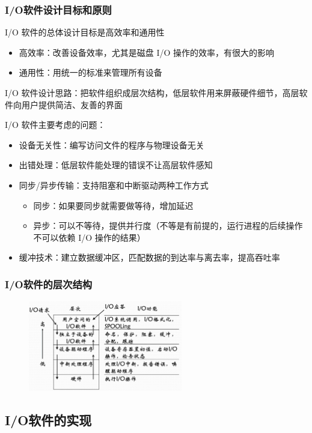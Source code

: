 \documentclass[cs4size,a4paper,10pt]{ctexart}
\begin{document}
	\subsubsection{I/O软件设计目标和原则}
	I/O 软件的总体设计目标是高效率和通用性
	\begin{itemize}
		\item 高效率：改善设备效率，尤其是磁盘 I/O 操作的效率，有很大的影响
		\item 通用性：用统一的标准来管理所有设备
	\end{itemize}

	I/O 软件设计思路：把软件组织成层次结构，低层软件用来屏蔽硬件细节，高层软件向用户提供简洁、友善的界面

	I/O 软件主要考虑的问题：
	\begin{itemize}
		\item 设备无关性：编写访问文件的程序与物理设备无关
		\item 出错处理：低层软件能处理的错误不让高层软件感知
		\item 同步/异步传输：支持阻塞和中断驱动两种工作方式
		\begin{itemize}
			\item 同步：如果要同步就需要做等待，增加延迟
			\item 异步：可以不等待，提供并行度（不等是有前提的，运行进程的后续操作不可以依赖 I/O 操作的结果）
		\end{itemize}
		\item 缓冲技术：建立数据缓冲区，匹配数据的到达率与离去率，提高吞吐率
	\end{itemize}

	\subsubsection{I/O软件的层次结构}
	\begin{figure}[H]
		\centering
		\includegraphics[width=0.6\textwidth]{img/4.2.1.2}
	\end{figure}

	\subsection{I/O软件的实现}
\end{document}
